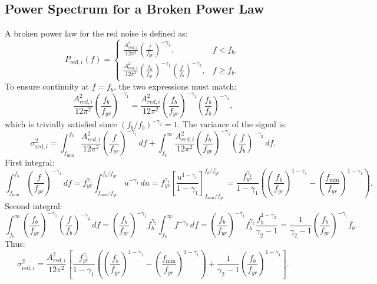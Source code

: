 \documentclass[11pt]{article}
\begin{document}
\subsection{Power Spectrum for a Broken Power Law}
A broken power law for the red noise is defined as:
\[
P_{\text{red},i}(f) =
\begin{cases} 
\frac{A_{red,i}^2}{12 \pi^2} \left( \frac{f}{f_{yr}} \right)^{-\gamma_1}, & f < f_b, \\
\frac{A_{red,i}^2}{12 \pi^2} \left( \frac{f_b}{f_{yr}} \right)^{-\gamma_1} \left( \frac{f}{f_b} \right)^{-\gamma_2}, & f \geq f_b.
\end{cases}
\]
To ensure continuity at $f = f_b$, the two expressions must match:
\[
\frac{A_{red,i}^2}{12 \pi^2} \left( \frac{f_b}{f_{yr}} \right)^{-\gamma_1} = \frac{A_{red,i}^2}{12 \pi^2} \left( \frac{f_b}{f_{yr}} \right)^{-\gamma_1} \left( \frac{f_b}{f_b} \right)^{-\gamma_2},
\]
which is trivially satisfied since $(f_b/f_b)^{-\gamma_2} = 1$. The variance of the signal is:
\[
\sigma_{\text{red},i}^2 = \int_{f_{\text{min}}}^{f_b} \frac{A_{red,i}^2}{12 \pi^2} \left( \frac{f}{f_{yr}} \right)^{-\gamma_1} \, df + \int_{f_b}^{\infty} \frac{A_{red,i}^2}{12 \pi^2} \left( \frac{f_b}{f_{yr}} \right)^{-\gamma_1} \left( \frac{f}{f_b} \right)^{-\gamma_2} \, df.
\]
First integral:
\[
\int_{f_{\text{min}}}^{f_b} \left( \frac{f}{f_{yr}} \right)^{-\gamma_1} \, df = f_{yr}^{\gamma_1} \int_{f_{\text{min}}/f_{yr}}^{f_b/f_{yr}} u^{-\gamma_1} \, du = f_{yr}^{\gamma_1} \left[ \frac{u^{1-\gamma_1}}{1-\gamma_1} \right]_{f_{\text{min}}/f_{yr}}^{f_b/f_{yr}} = \frac{f_{yr}^{\gamma_1}}{1-\gamma_1} \left( \left( \frac{f_b}{f_{yr}} \right)^{1-\gamma_1} - \left( \frac{f_{\text{min}}}{f_{yr}} \right)^{1-\gamma_1} \right).
\]
Second integral:
\[
\int_{f_b}^{\infty} \left( \frac{f_b}{f_{yr}} \right)^{-\gamma_1} \left( \frac{f}{f_b} \right)^{-\gamma_2} \, df = \left( \frac{f_b}{f_{yr}} \right)^{-\gamma_1} f_b^{\gamma_2} \int_{f_b}^{\infty} f^{-\gamma_2} \, df = \left( \frac{f_b}{f_{yr}} \right)^{-\gamma_1} f_b^{\gamma_2} \frac{f_b^{1-\gamma_2}}{\gamma_2-1} = \frac{1}{\gamma_2-1} \left( \frac{f_b}{f_{yr}} \right)^{-\gamma_1} f_b.
\]
Thus:
\[
\sigma_{\text{red},i}^2 = \frac{A_{red,i}^2}{12 \pi^2} \left[ \frac{f_{yr}^{\gamma_1}}{1-\gamma_1} \left( \left( \frac{f_b}{f_{yr}} \right)^{1-\gamma_1} - \left( \frac{f_{\text{min}}}{f_{yr}} \right)^{1-\gamma_1} \right) + \frac{1}{\gamma_2-1} \left( \frac{f_b}{f_{yr}} \right)^{1-\gamma_1} \right].
\]
\end{document}
